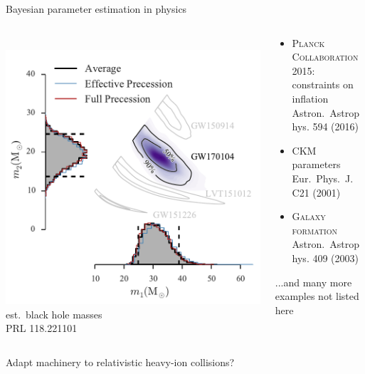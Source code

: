 \documentclass{beamer}
\begin{document}
\begin{frame}{Bayesian parameter estimation in physics}
  \bigskip
  \begin{columns}
    \begin{column}{0.4\textwidth}
      \\
      \includegraphics[width=\columnwidth]{ligo} \\
      est.\ black hole masses\\
      {\scriptsize PRL 118.221101}\\
    \end{column}
    \begin{column}{0.6\textwidth}
      \begin{itemize}
        \item {\scshape Planck Collaboration 2015:}\\
          constraints on inflation\\
          {\scriptsize Astron.~Astrophys. 594 (2016)}\\[2ex]
        \item CKM parameters\\
          {\scriptsize Eur.~Phys.~J. C21 (2001)}\\[2ex]
        \item {\scshape Galaxy formation}\\
          {\scriptsize Astron.~Astrophys. 409 (2003)}
      \end{itemize}
      \bigskip
      \small ...and many more examples not listed here
    \end{column}
  \end{columns}
  \bigskip
  \begin{tcolorbox}[colback=theme!10, colframe=theme!0]
    Adapt machinery to relativistic heavy-ion collisions?
  \end{tcolorbox}
\end{frame}
\end{document}
